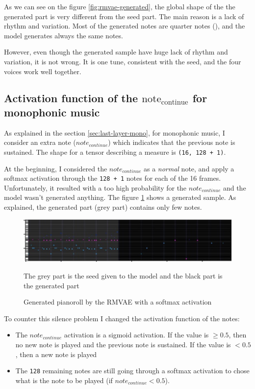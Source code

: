 \documentclass[12pt]{report}
\begin{document}
As we can see on the figure \ref{fig:rmvae-generated}, the global shape of the the generated part is very different from the seed part.
The main reason is a lack of rhythm and variation.
Most of the generated notes are quarter notes (\musQuarter), and the model generates always the same notes.

However, even though the generated sample have huge lack of rhythm and variation, it is not wrong.
It is one tune, consistent with the seed, and the four voices work well together.

\subsection{Activation function of the $\text{note}_{\text{continue}}$ for monophonic music}

As explained in the section \ref{sec:last-layer-mono}, for monophonic music, I consider an extra note ($note_{continue}$) which indicates that the previous note is sustained.
The shape for a tensor describing a measure is \texttt{(16, 128 + 1)}.

At the beginning, I considered the $note_{continue}$ as a \textit{normal} note, and apply a softmax activation through the \texttt{128 + 1} notes for each of the 16 frames.
Unfortunately, it resulted with a too high probability for the $note_{continue}$ and the model wasn't generated anything.
The figure \ref{fig:rmvae-generated-silence} shows a generated sample.
As explained, the generated part (grey part) contains only few notes.

\begin{figure}[htbp]
    \centering
    \includegraphics[width=\textwidth]{images/generated_midis/RMVAE/cnn_generation_silcence.jpg}
    \caption{Generated pianoroll by the RMVAE with a softmax activation}
    The grey part is the seed given to the model and the black part is the generated part
    \label{fig:rmvae-generated-silence}
\end{figure}

To counter this silence problem I changed the activation function of the notes:
\begin{itemize}
    \item The $note_{continue}$ activation is a sigmoid activation.
    If the value is $\geq 0.5$, then no new note is played and the previous note is sustained.
    If the value is $< 0.5$, then a new note is played
    \item The \texttt{128} remaining notes are still going through a softmax activation to chose what is the note to be played (if $note_{continue} <0.5$).
\end{itemize}
\end{document}

